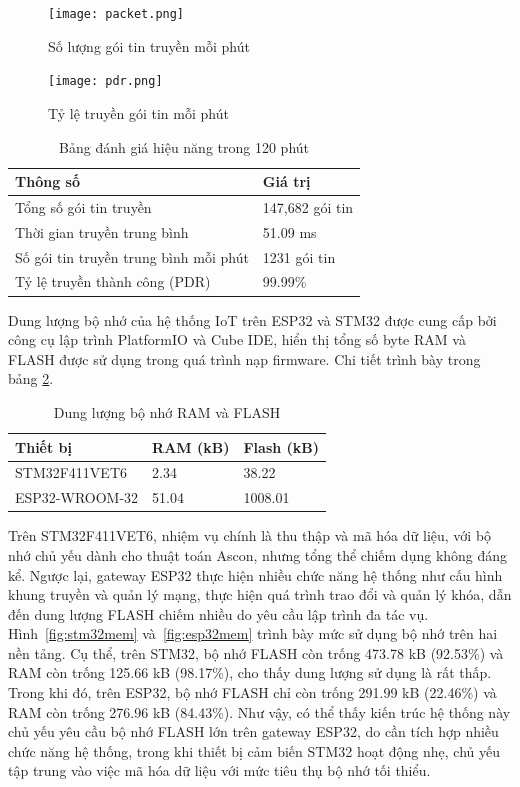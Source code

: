\begin{figure}[H]
    \centering
    \texttt{[image: packet.png]}
    \caption{Số lượng gói tin truyền mỗi phút}
    \label{fig:packet}
\end{figure}

\begin{figure}[H]
    \centering
    \texttt{[image: pdr.png]}
    \caption{Tỷ lệ truyền gói tin mỗi phút}
    \label{fig:pdr}
\end{figure}

\begin{table}[H]
    \centering
    \small
    \caption{Bảng đánh giá hiệu năng trong 120 phút}
    \label{tab:performance_metrics}
    \begin{tabular}{|p{10cm}|p{4cm}|}
        \hline
        \textbf{Thông số} & \textbf{Giá trị} \\
        \hline
        Tổng số gói tin truyền & 147,682 gói tin \\
        Thời gian truyền trung bình & 51.09 ms \\
        Số gói tin truyền trung bình mỗi phút & 1231 gói tin \\
        Tỷ lệ truyền thành công (PDR) & 99.99\% \\
        \hline
    \end{tabular}
\end{table}

Dung lượng bộ nhớ của hệ thống IoT trên ESP32 và STM32 được cung cấp bởi công cụ lập trình PlatformIO và Cube IDE, hiển thị tổng số byte RAM và FLASH được sử dụng trong quá trình nạp firmware. Chi tiết trình bày trong bảng \ref{tab:memory}.

\begin{table}[h]
\centering
\small
\caption{Dung lượng bộ nhớ RAM và FLASH}
\label{tab:memory}
\begin{tabular}{|p{4cm}|p{5cm}|p{3cm}|}
\hline
Thiết bị & RAM (kB) & Flash (kB) \\
\hline
STM32F411VET6   & 2.34  & 38.22  \\
ESP32-WROOM-32  & 51.04 & 1008.01 \\
\hline
\end{tabular}
\end{table}

Trên STM32F411VET6, nhiệm vụ chính là thu thập và mã hóa dữ liệu, với bộ nhớ chủ yếu dành cho thuật toán Ascon, nhưng tổng thể chiếm dụng không đáng kể. Ngược lại, gateway ESP32 thực hiện nhiều chức năng hệ thống như cấu hình khung truyền và quản lý mạng, thực hiện quá trình trao đổi và quản lý khóa, dẫn đến dung lượng FLASH chiếm nhiều do yêu cầu lập trình đa tác vụ. Hình~\ref{fig:stm32mem} và~\ref{fig:esp32mem} trình bày mức sử dụng bộ nhớ trên hai nền tảng. Cụ thể, trên STM32, bộ nhớ FLASH còn trống 473.78 kB (92.53\%) và RAM còn trống 125.66 kB (98.17\%), cho thấy dung lượng sử dụng là rất thấp. Trong khi đó, trên ESP32, bộ nhớ FLASH chỉ còn trống 291.99 kB (22.46\%) và RAM còn trống 276.96 kB (84.43\%). Như vậy, có thể thấy kiến trúc hệ thống này chủ yếu yêu cầu bộ nhớ FLASH lớn trên gateway ESP32, do cần tích hợp nhiều chức năng hệ thống, trong khi thiết bị cảm biến STM32 hoạt động nhẹ, chủ yếu tập trung vào việc mã hóa dữ liệu với mức tiêu thụ bộ nhớ tối thiểu.

